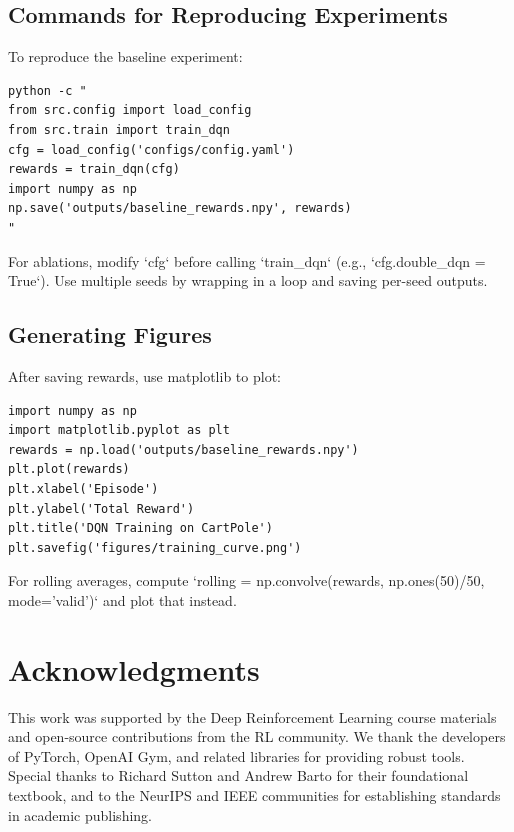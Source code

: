 \documentclass{IEEEtran}
\begin{document}
\subsection{Commands for Reproducing Experiments}

To reproduce the baseline experiment:
\begin{verbatim}
python -c "
from src.config import load_config
from src.train import train_dqn
cfg = load_config('configs/config.yaml')
rewards = train_dqn(cfg)
import numpy as np
np.save('outputs/baseline_rewards.npy', rewards)
"
\end{verbatim}

For ablations, modify `cfg` before calling `train_dqn` (e.g., `cfg.double_dqn = True`). Use multiple seeds by wrapping in a loop and saving per-seed outputs.

\subsection{Generating Figures}

After saving rewards, use matplotlib to plot:
\begin{verbatim}
import numpy as np
import matplotlib.pyplot as plt
rewards = np.load('outputs/baseline_rewards.npy')
plt.plot(rewards)
plt.xlabel('Episode')
plt.ylabel('Total Reward')
plt.title('DQN Training on CartPole')
plt.savefig('figures/training_curve.png')
\end{verbatim}

For rolling averages, compute `rolling = np.convolve(rewards, np.ones(50)/50, mode='valid')` and plot that instead.

\section*{Acknowledgments}

This work was supported by the Deep Reinforcement Learning course materials and open-source contributions from the RL community. We thank the developers of PyTorch, OpenAI Gym, and related libraries for providing robust tools. Special thanks to Richard Sutton and Andrew Barto for their foundational textbook, and to the NeurIPS and IEEE communities for establishing standards in academic publishing.



\end{document}
